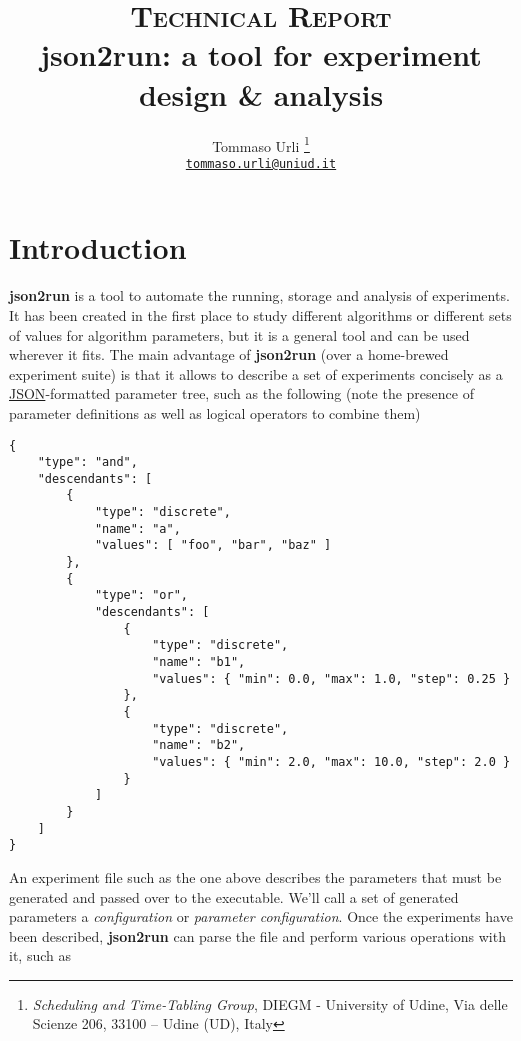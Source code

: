 \documentclass[11pt,notitlepage,twoside,a4paper]{article}
\begin{document}
\author{Tommaso Urli \thanks{\emph{Scheduling and Time-Tabling Group}, DIEGM - University of Udine, Via delle Scienze 206, 33100 -- Udine (UD), Italy}\\\texttt{\href{mailto:tommaso.urli@uniud.it}{tommaso.urli@uniud.it}}}
\title{\textsc{Technical Report}\\json2run: a tool for experiment design \&  analysis}

\maketitle

\tableofcontents

\section{Introduction}

\textbf{json2run} is a tool to automate the running, storage and
analysis of experiments. It has been created in the first place to study
different algorithms or different sets of values for algorithm
parameters, but it is a general tool and can be used wherever it fits.
The main advantage of \textbf{json2run} (over a home-brewed experiment
suite) is that it allows to describe a set of experiments concisely as a
\href{http://www.json.org}{JSON}-formatted parameter tree, such as the
following (note the presence of parameter definitions as well as logical
operators to combine them)

\begin{scriptsize}
\begin{lstlisting}
{
    "type": "and",
    "descendants": [
        {
            "type": "discrete",
            "name": "a",
            "values": [ "foo", "bar", "baz" ]
        },
        {
            "type": "or",
            "descendants": [
                {
                    "type": "discrete",
                    "name": "b1",
                    "values": { "min": 0.0, "max": 1.0, "step": 0.25 }
                },
                {
                    "type": "discrete",
                    "name": "b2",
                    "values": { "min": 2.0, "max": 10.0, "step": 2.0 }
                }
            ]
        }
    ]
}
\end{lstlisting}
\end{scriptsize}

An experiment file such as the one above describes the parameters that
must be generated and passed over to the executable. We'll call a set of
generated parameters a \emph{configuration} or \emph{parameter
configuration}. Once the experiments have been described,
\textbf{json2run} can parse the file and perform various operations with
it, such as
\end{document}
